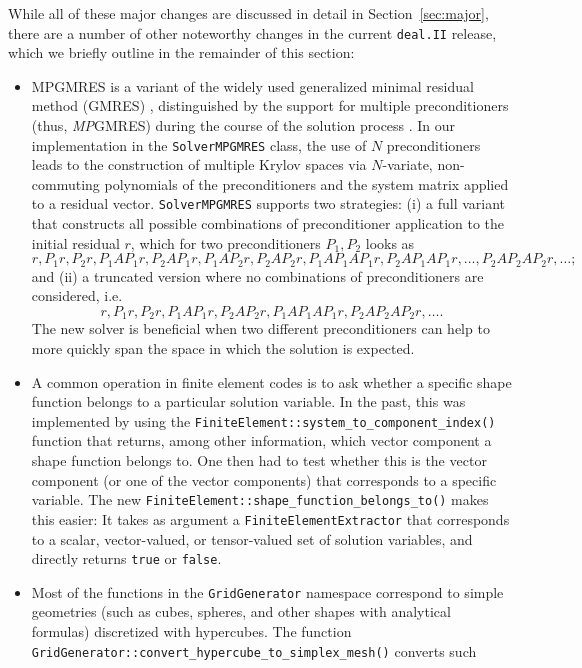 \documentclass{ansarticle-preprint}
\newcommand{\specialword}[1]{\texttt{#1}}
\newcommand{\dealii}{{\specialword{deal.II}}\xspace}
\begin{document}
While all of these major changes are discussed in detail in
Section~\ref{sec:major}, there
are a number of other noteworthy changes in the current \dealii release,
which we briefly outline in the remainder of this section:
%
\begin{itemize}
\item MPGMRES is a variant of the
  widely used generalized minimal residual method (GMRES)
  \cite{Saad1986gmres}, distinguished by the support for multiple
  preconditioners (thus, \textit{MP}GMRES)  during the course of the solution process
  \cite{Greif2016gmres}. In our implementation in the
  \texttt{SolverMPGMRES} class, the use of $N$ preconditioners leads
  to the construction of multiple Krylov spaces via
  $N$-variate, non-commuting polynomials of the preconditioners and the system
  matrix applied to a residual vector. \texttt{SolverMPGMRES}
  supports two strategies: (i) a full variant that constructs all possible
  combinations of preconditioner application to the initial residual $r$,
  which for two preconditioners $P_1, P_2$ looks as
  \[
    r, P_1r, P_2r, P_1AP_1r, P_2AP_1r, P_1AP_2r, P_2AP_2r, P_1AP_1AP_1r,
   P_2AP_1AP_1r, \ldots, P_2AP_2AP_2r, \ldots;
 \]
 and (ii) a truncated version where no combinations of preconditioners are considered, i.e.
 \[
    r, P_1r, P_2r, P_1AP_1r, P_2AP_2r, P_1AP_1AP_1r,
   P_2AP_2AP_2r, \ldots.
 \]
 The new solver is beneficial when two different preconditioners can help to
 more quickly span the space in which the solution is expected.
\item A common operation in finite element codes is to ask whether
  a specific shape function belongs to a particular solution
  variable. In the past, this was implemented by using the
  \texttt{FiniteElement::system\_to\_component\_index()} function that
  returns, among other information, which vector component a shape
  function belongs to. One then had to test whether this is the vector
  component (or one of the vector components) that corresponds to a
  specific variable. The new
  \texttt{FiniteElement::shape\_function\_belongs\_to()} makes this
  easier: It takes as argument a \texttt{FiniteElementExtractor} that
  corresponds to a scalar, vector-valued, or tensor-valued set of
  solution variables, and directly returns \texttt{true} or
  \texttt{false}.
\item Most of the functions in the \texttt{GridGenerator} namespace correspond
  to simple geometries (such as cubes, spheres, and other shapes with analytical
  formulas) discretized with hypercubes. The function
  \texttt{GridGenerator::convert\_hypercube\_to\_simplex\_mesh()} converts such

\end{itemize}
\end{document}
